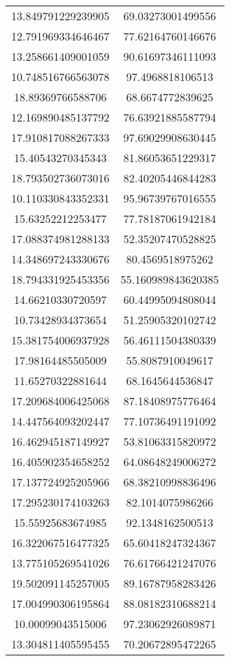 \begin{table}
\begin{tabular}{cc}
13.849791229239905 & 69.03273001499556 \\
12.791969334646467 & 77.62164760146676 \\
13.258661409001059 & 90.61697346111093 \\
10.748516766563078 & 97.4968818106513 \\
18.89369766588706 & 68.6674772839625 \\
12.169890485137792 & 76.63921885587794 \\
17.910817088267333 & 97.69029908630445 \\
15.40543270345343 & 81.86053651229317 \\
18.793502736073016 & 82.40205446844283 \\
10.110330843352331 & 95.96739767016555 \\
15.63252212253477 & 77.78187061942184 \\
17.088374981288133 & 52.35207470528825 \\
14.348697243330676 & 80.4569518975262 \\
18.794331925453356 & 55.160989843620385 \\
14.66210330720597 & 60.44995094808044 \\
10.73428934373654 & 51.25905320102742 \\
15.381754006937928 & 56.46111504380339 \\
17.98164485505009 & 55.8087910049617 \\
11.65270322881644 & 68.1645644536847 \\
17.209684006425068 & 87.18408975776464 \\
14.447564093202447 & 77.10736491191092 \\
16.462945187149927 & 53.81063315820972 \\
16.405902354658252 & 64.08648249006272 \\
17.137724925205966 & 68.38210998836496 \\
17.295230174103263 & 82.1014075986266 \\
15.55925683674985 & 92.1348162500513 \\
16.322067516477325 & 65.60418247324367 \\
13.775105269541026 & 76.61766421247076 \\
19.502091145257005 & 89.16787958283426 \\
17.004990306195864 & 88.08182310688214 \\
10.00099043515006 & 97.23062926089871 \\
13.304811405595455 & 70.20672895472265 \\

\end{tabular}
\end{table}
